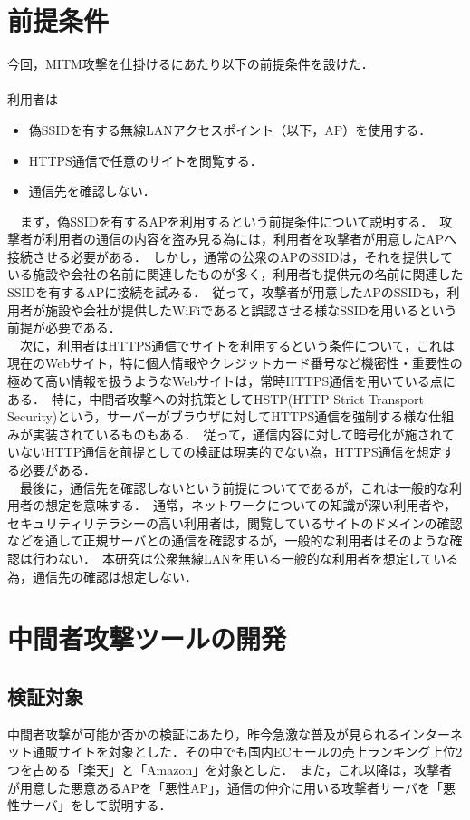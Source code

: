 \documentclass[dvipdfmx,twocolumn]{jsarticle}
\begin{document}
    \section{前提条件}
        今回，MITM攻撃を仕掛けるにあたり以下の前提条件を設けた．\\
        \\
        利用者は
        \begin{itemize}
            \item 偽SSIDを有する無線LANアクセスポイント（以下，AP）を使用する．
            \item HTTPS通信で任意のサイトを閲覧する．
            \item 通信先を確認しない．
        \end{itemize}
        　まず，偽SSIDを有するAPを利用するという前提条件について説明する．\
        攻撃者が利用者の通信の内容を盗み見る為には，利用者を攻撃者が用意したAPへ接続させる必要がある．\
        しかし，通常の公衆のAPのSSIDは，それを提供している施設や会社の名前に関連したものが多く，利用者も提供元の名前に関連したSSIDを有するAPに接続を試みる．\
        従って，攻撃者が用意したAPのSSIDも，利用者が施設や会社が提供したWiFiであると誤認させる様なSSIDを用いるという前提が必要である．\\
        　次に，利用者はHTTPS通信でサイトを利用するという条件について，これは現在のWebサイト，特に個人情報やクレジットカード番号など機密性・重要性の極めて高い情報を扱うようなWebサイトは，常時HTTPS通信を用いている点にある．\
        特に，中間者攻撃への対抗策としてHSTP(HTTP Strict Transport Security)という，サーバーがブラウザに対してHTTPS通信を強制する様な仕組みが実装されているものもある．\
        従って，通信内容に対して暗号化が施されていないHTTP通信を前提としての検証は現実的でない為，HTTPS通信を想定する必要がある．\\
        　最後に，通信先を確認しないという前提についてであるが，これは一般的な利用者の想定を意味する．\
        通常，ネットワークについての知識が深い利用者や，セキュリティリテラシーの高い利用者は，閲覧しているサイトのドメインの確認などを通して正規サーバとの通信を確認するが，一般的な利用者はそのような確認は行わない．\
        本研究は公衆無線LANを用いる一般的な利用者を想定している為，通信先の確認は想定しない．\\
    \section{中間者攻撃ツールの開発}
        \subsection{検証対象}
            中間者攻撃が可能か否かの検証にあたり，昨今急激な普及が見られるインターネット通販サイトを対象とした．その中でも国内ECモールの売上ランキング上位2つを占める「楽天」と「Amazon」を対象とした．\
            また，これ以降は，攻撃者が用意した悪意あるAPを「悪性AP」，通信の仲介に用いる攻撃者サーバを「悪性サーバ」をして説明する．
\end{document}
